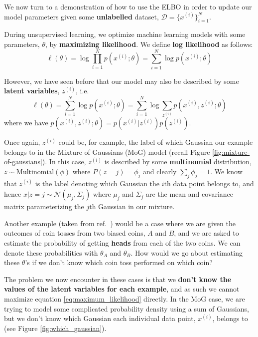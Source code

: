 \documentclass[]{article}
\begin{document}
We now turn to a demonstration of how to use the ELBO in order to update our model parameters given some \textbf{unlabelled} dataset, $\mathcal{D}= \{x^{(i)}\}_{i=1}^N$.

During unsupervised learning, we optimize machine learning models with some parameters, $\theta$, by \textbf{maximizing likelihood}. We define \textbf{log likelihood} as follows:
\begin{equation}\label{eq:maximum_likelihood}
    \ell(\theta) = \log \prod_{i=1}^N p(x^{(i)}; \theta) = \sum_{i=1}^N \log p(x^{(i)}; \theta)
\end{equation}

However, we have seen before that our model may also be described by some \textbf{latent variables}, $z^{(i)}$, i.e.\
\begin{equation}
    \ell (\theta) = \sum_{i=1}^N \log p(x^{(i)}; \theta) = \sum_{i=1}^N \log \sum_{z^{(i)}} p(x^{(i)}, z^{(i)} ;\theta)
\end{equation}
where we have $p(x^{(i)}, z^{(i)};\theta) = p(x^{(i)}|z^{(i)})p(z^{(i)})$. 

Once again, $z^{(i)}$ could be, for example, the label of which Gaussian our example belongs to in the Mixture of Gaussians (MoG) model (recall Figure \ref{fig:mixture-of-gaussians}). In this case, $z^{(i)}$ is described by some \textbf{multinomial} distribution, $z \sim \text{Multinomial}(\phi)$ where $P(z=j) = \phi_{j}$ and clearly $\sum_j \phi_j =1$. We know that $z^{(i)}$ is the label denoting which Gaussian the $i\text{th}$ data point belongs to, and hence $x | z=j \sim \mathcal{N}(\mu_j, \Sigma_j)$ where $\mu_j$ and $\Sigma_j$ are the mean and covariance matrix parameterizing the $j\text{th}$ Gaussian in our mixture.

Another example (taken from ref.~\cite{Chuong2008}) would be a case where we are given the outcomes of coin tosses from two biased coins, $A$ and $B$, and we are asked to estimate the probability of getting \textbf{heads} from each of the two coins. We can denote these probabilities with $\theta_A$ and $\theta_B$. How would we go about estimating these $\theta$'s if we don't know which coin toss performed on which coin?

The problem we now encounter in these cases is that we \textbf{don't know the values of the latent variables for each example}, and as such we cannot maximize equation \ref{eq:maximum_likelihood} directly. In the MoG case, we are trying to model some complicated probability density using a sum of Gaussians, but we don't know which Gaussian each individual data point, $x^{(i)}$, belongs to (see Figure \ref{fig:which_gaussian}).
\end{document}

